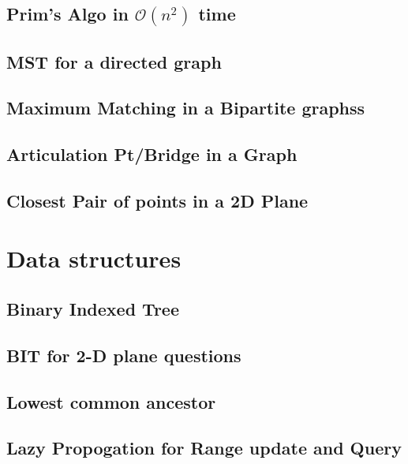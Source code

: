 \subsection{Prim's Algo in $\mathcal{O}(n^2)$ time}
\raggedbottom
\hrulefill
\subsection{MST for a directed graph}
\raggedbottom
\hrulefill
\subsection{Maximum Matching in a Bipartite graphss}
\raggedbottom
\hrulefill
\subsection{Articulation Pt/Bridge in a Graph}
\raggedbottom
\hrulefill
\subsection{Closest Pair of points in a 2D Plane}
\raggedbottom
\hrulefill

\section{Data structures}
\subsection{Binary Indexed Tree}
\raggedbottom
\hrulefill
\subsection{BIT for 2-D plane questions}
\raggedbottom
\hrulefill
\subsection{Lowest common ancestor}
\raggedbottom
\hrulefill
\subsection{Lazy Propogation for Range update and Query}
\raggedbottom
\hrulefill
